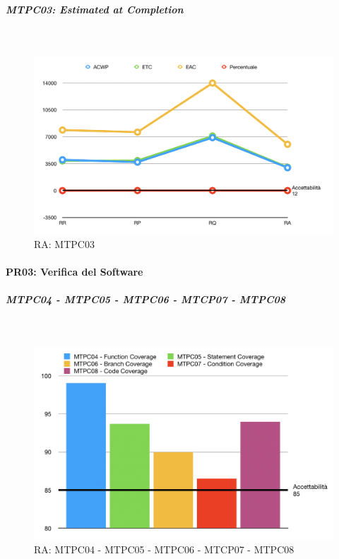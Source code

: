 \subparagraph{MTPC03: Estimated at Completion}  \-\\

\begin{figure}[H]
	\begin{center}
		\includegraphics[scale=0.5]{./images/grafici_RA/MTPC03.png} 
		\caption{RA: MTPC03}
	\end{center}
\end{figure}

\pagebreak

\paragraph{PR03: Verifica del Software}

\subparagraph{MTPC04 - MTPC05 - MTPC06 - MTCP07 - MTPC08}  \-\\

\begin{figure}[H]
	\begin{center}
		\includegraphics[scale=0.5]{./images/grafici_RA/PR03.png} 
		\caption{RA: MTPC04 - MTPC05 - MTPC06 - MTCP07 - MTPC08}
	\end{center}
\end{figure}

